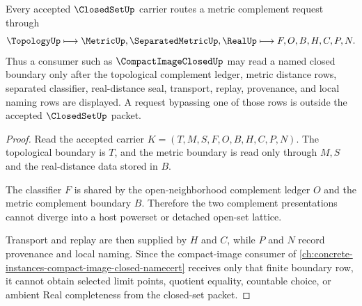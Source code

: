 \begin{theorem}\label{thm:closedset-metric-complement-boundary}
Every accepted $\ClosedSetUp$ carrier routes a metric complement request through
$$
\TopologyUp
\longmapsto
\MetricUp,\SeparatedMetricUp,\RealUp
\longmapsto
F,O,B,H,C,P,N .
$$
Thus a consumer such as $\CompactImageClosedUp$ may read a named closed boundary only after the topological complement ledger, metric distance rows, separated classifier, real-distance seal, transport, replay, provenance, and local naming rows are displayed. A request bypassing one of those rows is outside the accepted $\ClosedSetUp$ packet.
\end{theorem}
\begin{proof}
Read the accepted carrier $K=(T,M,S,F,O,B,H,C,P,N)$. The topological boundary is $T$, and the metric boundary is read only through $M,S$ and the real-distance data stored in $B$.

The classifier $F$ is shared by the open-neighborhood complement ledger $O$ and the metric complement boundary $B$. Therefore the two complement presentations cannot diverge into a host powerset or detached open-set lattice.

Transport and replay are then supplied by $H$ and $C$, while $P$ and $N$ record provenance and local naming. Since the compact-image consumer of \autoref{ch:concrete-instances-compact-image-closed-namecert} receives only that finite boundary row, it cannot obtain selected limit points, quotient equality, countable choice, or ambient Real completeness from the closed-set packet.
\end{proof}

